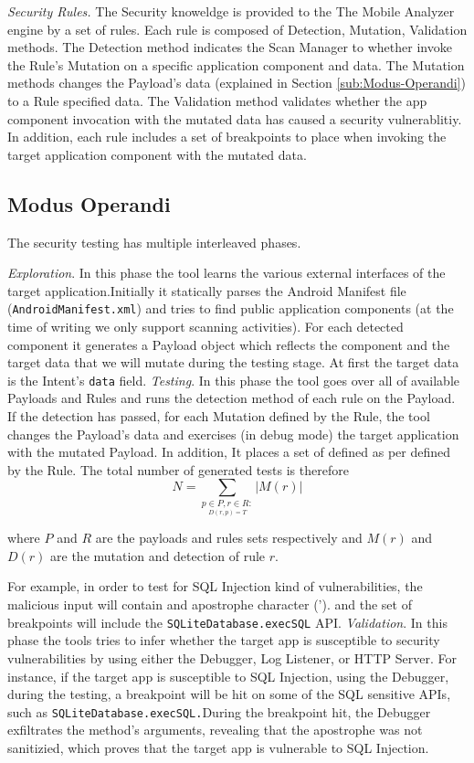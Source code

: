 \textit{Security Rules. }The Security knoweldge is provided to the
The Mobile Analyzer engine by a set of rules. Each rule is composed
of Detection, Mutation, Validation methods. The Detection method indicates
the Scan Manager to whether invoke the Rule's Mutation on a specific
application component and data. The Mutation methods changes the Payload's
data (explained in Section \ref{sub:Modus-Operandi}) to a Rule specified
data. The Validation method validates whether the app component invocation
with the mutated data has caused a security vulnerablitiy. In addition,
each rule includes a set of breakpoints to place when invoking the
target application component with the mutated data.


\subsection{Modus Operandi\label{sub:Modus-Operandi}}

The security testing has multiple interleaved phases.

\textit{Exploration}. In this phase the tool learns the various external
interfaces of the target application.Initially it statically parses
the Android Manifest file (\texttt{AndroidManifest.xml}) and tries
to find public application components (at the time of writing we only
support scanning activities). For each detected component it generates
a Payload object which reflects the component and the target data
that we will mutate during the testing stage. At first the target
data is the Intent's \texttt{data} field. \textit{Testing}. In this
phase the tool goes over all of available Payloads and Rules and runs
the detection method of each rule on the Payload. If the detection
has passed, for each Mutation defined by the Rule, the tool changes
the Payload's data and exercises (in debug mode) the target application
with the mutated Payload. In addition, It places a set of defined
as per defined by the Rule. The total number of generated tests is
therefore 
\[
N=\sum_{\underset{D(r,p)=T}{p\in P,r\in R:}}|M(r)|
\]


where $P$ and $R$ are the payloads and rules sets respectively and
$M(r)$ and $D(r)$ are the mutation and detection of rule $r$. 

For example, in order to test for SQL Injection kind of vulnerabilities,
the malicious input will contain and apostrophe character ('). and
the set of breakpoints will include the \texttt{SQLiteDatabase.execSQL}
API.\textit{ Validation}. In this phase the tools tries to infer whether
the target app is susceptible to security vulnerabilities by using
either the Debugger, Log Listener, or HTTP Server. For instance, if
the target app is susceptible to SQL Injection, using the Debugger,
during the testing, a breakpoint will be hit on some of the SQL sensitive
APIs, such as \texttt{SQLiteDatabase.execSQL.}During the breakpoint
hit, the Debugger exfiltrates the method's arguments, revealing that
the apostrophe was not sanitizied, which proves that the target app
is vulnerable to SQL Injection.

